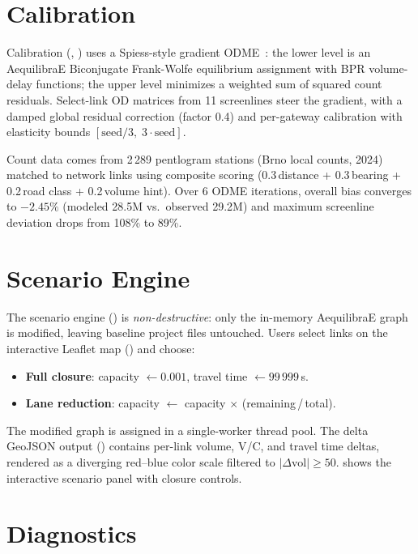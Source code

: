 \documentclass{ExcelAtFIT}
\begin{document}
\section{Calibration}

Calibration (, ) uses a Spiess-style gradient ODME~\cite{Cascetta2009}: the lower level is an AequilibraE Biconjugate Frank-Wolfe equilibrium assignment with BPR volume-delay functions; the upper level minimizes a weighted sum of squared count residuals.
Select-link OD matrices from 11 screenlines steer the gradient, with a damped global residual correction (factor 0.4) and per-gateway calibration with elasticity bounds $[\text{seed}/3,\; 3 \cdot \text{seed}]$.

Count data comes from 2\,289 pentlogram stations (Brno local counts, 2024) matched to network links using composite scoring (0.3\,distance + 0.3\,bearing + 0.2\,road class + 0.2\,volume hint).
Over 6 ODME iterations, overall bias converges to $-2.45\%$ (modeled 28.5M vs.\ observed 29.2M) and maximum screenline deviation drops from 108\% to 89\%.


\section{Scenario Engine}

The scenario engine () is \emph{non-destructive}: only the in-memory AequilibraE graph is modified, leaving baseline project files untouched.
Users select links on the interactive Leaflet map () and choose:
\begin{itemize}
  \item \textbf{Full closure}: capacity $\leftarrow 0.001$, travel time $\leftarrow 99\,999$\,s.
  \item \textbf{Lane reduction}: capacity $\leftarrow$ capacity $\times$ (remaining\,/\,total).
\end{itemize}
The modified graph is assigned in a single-worker thread pool.
The delta GeoJSON output () contains per-link volume, V/C, and travel time deltas, rendered as a diverging red--blue color scale filtered to $|\Delta\text{vol}| \geq 50$.
 shows the interactive scenario panel with closure controls.


\section{Diagnostics}
\end{document}
